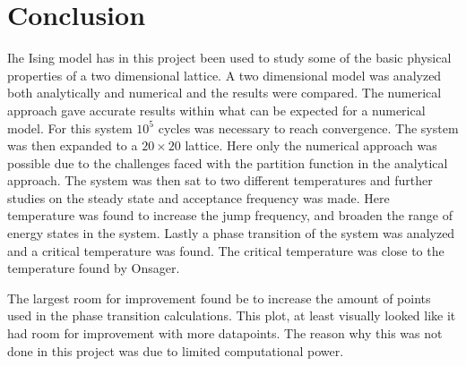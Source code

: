 \section{Conclusion}



Ihe Ising model has in this project been used to study some of the basic physical properties of a two dimensional lattice. A two dimensional model was analyzed both analytically and numerical and the results were compared. The numerical approach gave accurate results within what can be expected for a numerical model. For this system $10^5$ cycles was necessary to reach convergence. The system was then expanded to a $20\times20$ lattice. Here only the numerical approach was possible due to the challenges faced with the partition function in the analytical approach. The system was then sat to two different temperatures and further studies on the steady state and acceptance frequency was made. Here temperature was found to increase the jump frequency, and broaden the range of energy states in the system.
Lastly a phase transition of the system was analyzed and a critical temperature was found. The critical temperature was close to the temperature found by Onsager.

The largest room for improvement found be to increase the amount of points used in the phase transition calculations. This plot, at least visually looked like it had room for improvement with more datapoints. The reason why this was not done in this project was due to limited computational power.


























